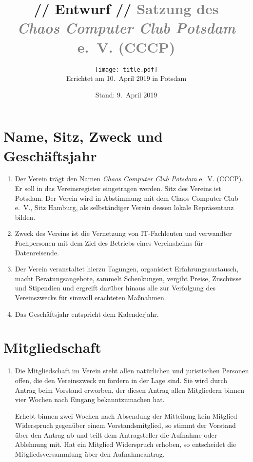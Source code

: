 \documentclass[a4paper, 10pt, headings=normal]{scrartcl}
\title{\textcolor{alert}{// Entwurf //} \textcolor{gray}{Satzung des \\ \emph{Chaos Computer Club Potsdam} e.~V. (CCCP)}}
\author{\texttt{[image: title.pdf]} \\[10pt] Errichtet am 10.~April 2019 in Potsdam}
\date{Stand: 9.~April 2019}
\begin{document}
\maketitle
\pagestyle{myheadings}

\begin{multicols}{2}

\section{Name, Sitz, Zweck und Geschäftsjahr}
\label{par:name-sitz-zweck}

\begin{enumerate}[label={(\arabic*)}]
	\item
		Der Verein trägt den Namen \emph{Chaos Computer Club Potsdam} e.~V. (CCCP).
		Er soll in das Vereinsregister eingetragen werden.
		Sitz des Vereins ist Potsdam.
		Der Verein wird in Abstimmung mit dem Chaos Computer Club e.~V., Sitz Hamburg, als selbständiger Verein dessen lokale Repräsentanz bilden.
	\item
		Zweck des Vereins ist die Vernetzung von IT-Fachleuten und verwandter Fachpersonen mit dem Ziel des Betriebs eines Vereinsheims für Datenreisende.
	\item
		Der Verein veranstaltet hierzu Tagungen, organisiert Erfahrungsaustausch, macht Beratungsangebote, sammelt Schenkungen, vergibt Preise, Zuschüsse und Stipendien und ergreift darüber hinaus alle zur Verfolgung des Vereinszwecks für sinnvoll erachteten Maßnahmen.
	\item
		Das Geschäftsjahr entspricht dem Kalenderjahr.
\end{enumerate}

\section{Mitgliedschaft}
\label{par:mitgliedschaft}

\begin{enumerate}[label={(\arabic*)}]
	\item
		Die Mitgliedschaft im Verein steht allen natürlichen und juristischen Personen offen, die den Vereinszweck zu fördern in der Lage sind.
		Sie wird durch Antrag beim Vorstand erworben, der diesen Antrag allen Mitgliedern binnen vier Wochen nach Eingang bekanntzumachen hat.

		Erhebt binnen zwei Wochen nach Absendung der Mitteilung kein Mitglied Widerspruch gegenüber einem Vorstandsmitglied, so stimmt der Vorstand über den Antrag ab und teilt dem Antragsteller die Aufnahme oder Ablehnung mit.
		Hat ein Mitglied Widerspruch erhoben, so entscheidet die Mitgliedsversammlung über den Aufnahmeantrag.


\end{enumerate}
\end{multicols}
\end{document}
